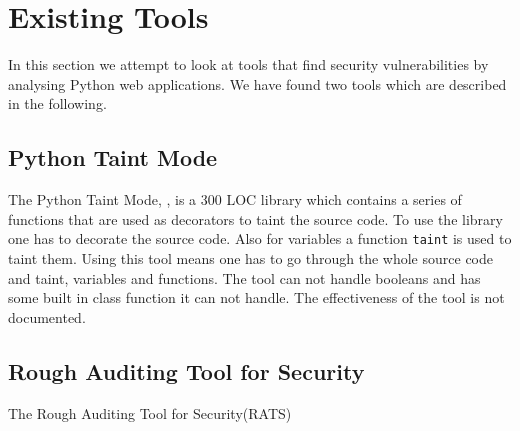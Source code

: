 \section{Existing Tools}
In this section we attempt to look at tools that find security vulnerabilities by analysing Python web applications.
We have found two tools which are described in the following.

\subsection{Python Taint Mode}
The Python Taint Mode, \citet{conti2010taint}, is a 300 LOC library which contains a series of functions that are used as decorators to taint the source code.
To use the library one has to decorate the source code.
Also for variables a function \texttt{taint} is used to taint them.
Using this tool means one has to go through the whole source code and taint, variables and functions.
The tool can not handle booleans and has some built in class function it can not handle.
The effectiveness of the tool is not documented.

\subsection{Rough Auditing Tool for Security}
The Rough Auditing Tool for Security(RATS)
